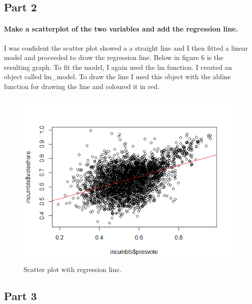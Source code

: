 \documentclass{article}
\begin{document}
\subsection{Part 2}
\paragraph{Make a scatterplot of the two variables and add the regression line.}
I was confident the scatter plot showed a a straight line and I then fitted a linear model and proceeded to draw the regression line. Below in figure 6 is the resulting graph. To fit the model, I again used the lm function. I created an object called lm\_model. To draw the line I used this object with the abline function for drawing the line and coloured it in red.
\begin{figure}[H]
	\centering
	\includegraphics[width=0.9\linewidth]{Question3 - Scatter Plot with regression line.png}
	\caption{Scatter plot with regression line.}
	\label{fig:Scatter plot with regression line}
\end{figure}
\subsection{Part 3}
\end{document}
